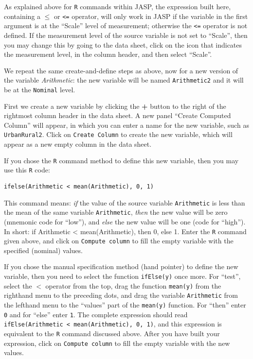 \documentclass[
]{book}
\begin{document}
As explained above for \texttt{R} commands within JASP, the expression built here, containing a \(\leq\) or \texttt{\textless{}=} operator, will only work in JASP if the variable in the first argument is at the ``Scale'' level of measurement; otherwise the \texttt{\textless{}=} operator is not defined. If the measurement level of the source variable is not set to ``Scale'', then you may change this by going to the data sheet, click on the icon that indicates the measurement level, in the column header, and then select ``Scale''.

We repeat the same create-and-define steps as above, now for a new version of the variable \emph{Arithmetic}: the new variable will be named \texttt{Arithmetic2} and it will be at the \texttt{Nominal} level.

First we create a new variable by clicking the \textbf{+} button to the right of the rightmost column header in the data sheet. A new panel ``Create Computed Column'' will appear, in which you can enter a name for the new variable, such as \texttt{UrbanRural2}. Click on \texttt{Create\ Column} to create the new variable, which will appear as a new empty column in the data sheet.

If you chose the \texttt{R} command method to define this new variable, then you may use this \texttt{R} code:

\begin{verbatim}
ifelse(Arithmetic < mean(Arithmetic), 0, 1)
\end{verbatim}

This command means: \emph{if} the value of the source variable \texttt{Arithmetic} is less than the mean of the same variable \texttt{Arithmetic}, \emph{then} the new value will be zero (mnemonic code for ``low''), and \emph{else} the new value will be one (code for ``high''). In short: if Arithmetic \textless{} mean(Arithmetic), then 0, else 1. Enter the \texttt{R} command given above, and click on \texttt{Compute\ column} to fill the empty variable with the specified (nominal) values.

If you chose the manual specification method (hand pointer) to define the new variable, then you need to select the function \texttt{ifElse(y)} once more. For ``test'', select the \(<\) operator from the top, drag the function \texttt{mean(y)} from the righthand menu to the preceding dots, and drag the variable \texttt{Arithmetic} from the lefthand menu to the ``values'' part of the \texttt{mean(y)} function. For ``then'' enter \texttt{0} and for ``else'' enter \texttt{1}. The complete expression should read \texttt{ifElse(Arithmetic\ \textless{}\ mean(Arithmetic),\ 0,\ 1)}, and this expression is equivalent to the \texttt{R} command discussed above.
After you have built your expression, click on \texttt{Compute\ column} to fill the empty variable with the new values.
\end{document}
